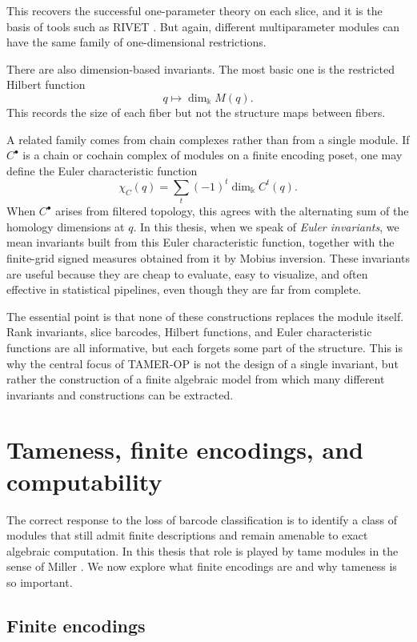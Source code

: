\documentclass[11pt]{article}
\newcommand{\kk}{\Bbbk}
\newcommand{\TAMER}{\textsc{TAMER-OP}}
\theoremstyle{definition}
\theoremstyle{remark}
\begin{document}
This recovers the successful one-parameter theory on each slice, and it is the basis of tools such as RIVET \cite{LW15,RIVET}. But again, different multiparameter modules can have the same family of one-dimensional restrictions.

There are also dimension-based invariants. The most basic one is the restricted Hilbert function
\[
q \longmapsto \dim_{\kk} M(q).
\]
This records the size of each fiber but not the structure maps between fibers.

A related family comes from chain complexes rather than from a single module. If $C^\bullet$ is a chain or cochain complex of modules on a finite encoding poset, one may define the Euler characteristic function
\[
\chi_C(q) = \sum_t (-1)^t \dim_{\kk} C^t(q).
\]
When $C^\bullet$ arises from filtered topology, this agrees with the alternating sum of the homology dimensions at $q$. In this thesis, when we speak of \emph{Euler invariants}, we mean invariants built from this Euler characteristic function, together with the finite-grid signed measures obtained from it by Mobius inversion. These invariants are useful because they are cheap to evaluate, easy to visualize, and often effective in statistical pipelines, even though they are far from complete.

The essential point is that none of these constructions replaces the module itself. Rank invariants, slice barcodes, Hilbert functions, and Euler characteristic functions are all informative, but each forgets some part of the structure. This is why the central focus of \TAMER{} is not the design of a single invariant, but rather the construction of a finite algebraic model from which many different invariants and constructions can be extracted.

\section{Tameness, finite encodings, and computability}\label{sec:tameness}

The correct response to the loss of barcode classification is to identify a class of modules that still admit finite descriptions and remain amenable to exact algebraic computation. In this thesis that role is played by tame modules in the sense of Miller \cite{Mil20}. We now explore what finite encodings are and why tameness is so important.

\subsection{Finite encodings}
\end{document}
